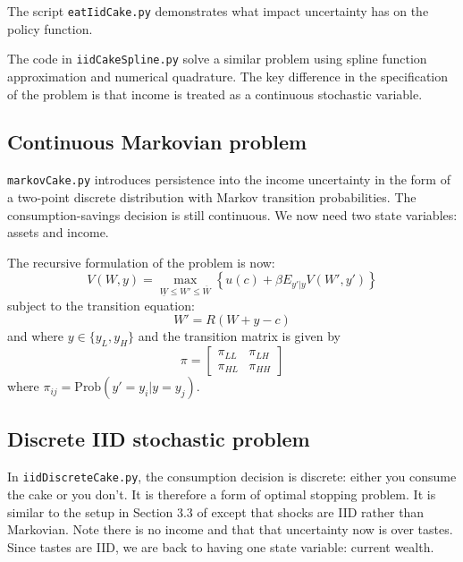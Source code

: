 The script \texttt{eatIidCake.py} demonstrates what impact uncertainty has on the policy function.

The code in \texttt{iidCakeSpline.py} solve a similar problem using spline function approximation and numerical quadrature. The key difference in the specification of the problem is that income is treated as a continuous stochastic variable.


\subsection{Continuous Markovian problem}

\texttt{markovCake.py} introduces persistence into the income uncertainty in the form of a two-point discrete distribution with Markov transition probabilities. The consumption-savings decision is still continuous. We now need two state variables: assets and income.

The recursive formulation of the problem is now:
\begin{equation}
	V(W, y) = \max_{\underline{W} \leq W' \leq \overline{W}} \left\{ u(c) + \beta E_{y' | y} V(W', y') \right\}
\end{equation}
subject to the transition equation:
\begin{equation}
	W' = R (W + y - c)
\end{equation}
and where \(y \in \{y_L, y_H\}\) and the transition matrix is given by
\begin{equation}
	\pi = 
	\left[
	\begin{matrix}
		\pi_{LL} & \pi_{LH} \\
		\pi_{HL} & \pi_{HH}
	\end{matrix}
	\right]
\end{equation}
where \(\pi_{ij} = \text{Prob}(y' = y_i | y = y_j)\).

\subsection{Discrete IID stochastic problem}

In \texttt{iidDiscreteCake.py}, the consumption decision is discrete: either you consume the cake or you don't. It is therefore a form of optimal stopping problem. It is similar to the setup in Section 3.3 of \citet{adda2003dynamic} except that shocks are IID rather than Markovian. Note there is no income and that that uncertainty now is over tastes. Since tastes are IID, we are back to having one state variable: current wealth.

